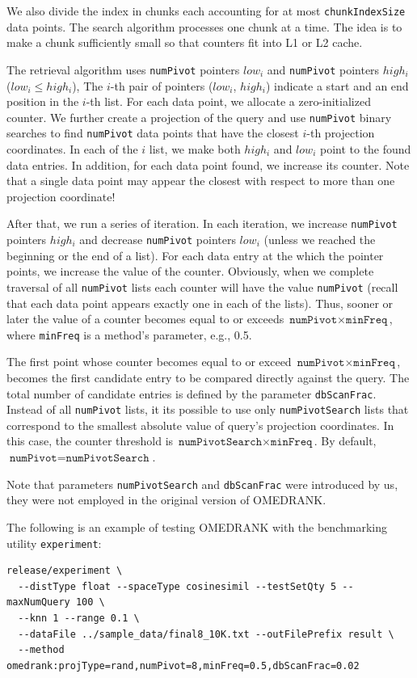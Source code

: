 \documentclass[runningheads,a4paper]{llncs}
\newcommand{\ttt}[1]{\texttt{#1}}
\begin{document}
{We also divide the index in chunks each accounting for at most \ttt{chunkIndexSize} data points.
The search algorithm processes one chunk at a time. The idea is to make a chunk sufficiently small
so that counters fit into L1 or L2  cache.


The retrieval algorithm uses \ttt{numPivot} pointers $low_i$ and \ttt{numPivot} pointers $high_i$ ($low_i \le high_i$),
The \mbox{$i$-th} pair of pointers ($low_i$, $high_i$) indicate a start and an end position in the \mbox{$i$-th} list.
For each data point, we allocate a zero-initialized counter.
We further create a projection of the query and use \ttt{numPivot} binary searches to find 
\ttt{numPivot} data points that have the closest \mbox{$i$-th} projection coordinates.
In each of the $i$ list, we make both $high_i$ and $low_i$ point to the found data entries.
In addition, for each data point found, we increase its counter.
Note that a single data point may appear the closest with respect to more than one projection coordinate!

After that, we run a series of iteration. In each iteration, we increase \ttt{numPivot} pointers $high_i$ and
decrease \ttt{numPivot} pointers $low_i$ (unless we reached the beginning or the end of a list).
For each data entry at the which the pointer points, we increase the value of the counter.
Obviously, when we complete traversal of all \ttt{numPivot} lists each counter will have the value \ttt{numPivot} (recall
that each data point appears exactly one in each of the lists).
Thus, sooner or later the value of a counter becomes equal to or exceeds $\ttt{numPivot} \times \ttt{minFreq}$, where \ttt{minFreq}
is a method's parameter, e.g., 0.5.

The first point whose counter becomes equal to or exceed $\ttt{numPivot} \times \ttt{minFreq}$, becomes the first candidate
entry to be compared directly against the query. The total number of candidate entries is defined by the parameter \ttt{dbScanFrac}.
Instead of all \ttt{numPivot} lists, it its possible to use only \ttt{numPivotSearch} lists that correspond
to the smallest absolute value of query's projection coordinates. In this case, the counter threshold is  $\ttt{numPivotSearch} \times \ttt{minFreq}$.
By default, $\ttt{numPivot}=\ttt{numPivotSearch}$.

Note that parameters \ttt{numPivotSearch} and \ttt{dbScanFrac}
were introduced by us, they were not employed in the original version of OMEDRANK.


The following is an example of testing OMEDRANK with the benchmarking utility \ttt{experiment}:
{
\footnotesize
\begin{verbatim}
release/experiment \
  --distType float --spaceType cosinesimil --testSetQty 5 --maxNumQuery 100 \
  --knn 1 --range 0.1 \
  --dataFile ../sample_data/final8_10K.txt --outFilePrefix result \
  --method omedrank:projType=rand,numPivot=8,minFreq=0.5,dbScanFrac=0.02
\end{verbatim}
}



}
\end{document}
